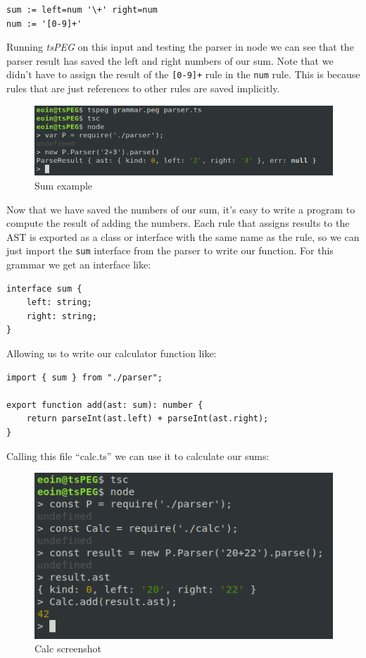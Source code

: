 \begin{verbatim}
sum := left=num '\+' right=num
num := '[0-9]+'
\end{verbatim}

Running \emph{tsPEG} on this input and testing the parser in node we can
see that the parser result has saved the left and right numbers of our
sum. Note that we didn't have to assign the result of the
\texttt{{[}0-9{]}+} rule in the \texttt{num} rule. This is because rules
that are just references to other rules are saved implicitly.

\begin{figure}[ht]
\centering
    \includegraphics[scale=0.7]{src/app1assets/sum.png}
\caption{Sum example}
\end{figure}

Now that we have saved the numbers of our sum, it's easy to write a
program to compute the result of adding the numbers. Each rule that
assigns results to the AST is exported as a class or interface with the
same name as the rule, so we can just import the \texttt{sum} interface
from the parser to write our function. For this grammar we get an
interface like:

\begin{verbatim}
interface sum {
    left: string;
    right: string;
}
\end{verbatim}

Allowing us to write our calculator function like:

\begin{verbatim}
import { sum } from "./parser";

export function add(ast: sum): number {
    return parseInt(ast.left) + parseInt(ast.right);
}
\end{verbatim}

Calling this file ``calc.ts'' we can use it to calculate our sums:

\begin{figure}[ht]
\centering
\includegraphics{src/app1assets/calc.png}
\caption{Calc screenshot}
\end{figure}

